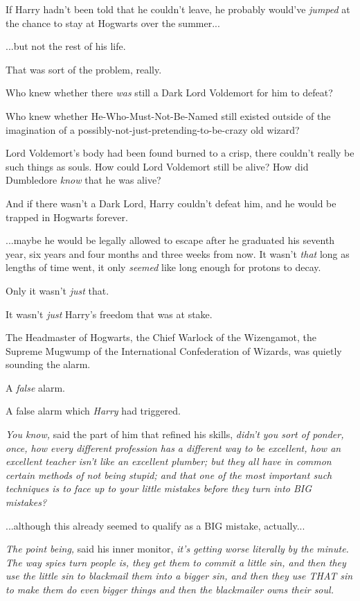 If Harry hadn't been told that he couldn't leave, he probably would've \emph{jumped} at the chance to stay at Hogwarts over the summer...

...but not the rest of his life.

That was sort of the problem, really.

Who knew whether there \emph{was} still a Dark Lord Voldemort for him to defeat?

Who knew whether He-Who-Must-Not-Be-Named still existed outside of the imagination of a possibly-not-just-pretending-to-be-crazy old wizard?

Lord Voldemort's body had been found burned to a crisp, there couldn't really be such things as souls. How could Lord Voldemort still be alive? How did Dumbledore \emph{know} that he was alive?

And if there wasn't a Dark Lord, Harry couldn't defeat him, and he would be trapped in Hogwarts forever.

...maybe he would be legally allowed to escape after he graduated his seventh year, six years and four months and three weeks from now. It wasn't \emph{that} long as lengths of time went, it only \emph{seemed} like long enough for protons to decay.

Only it wasn't \emph{just} that.

It wasn't \emph{just} Harry's freedom that was at stake.

The Headmaster of Hogwarts, the Chief Warlock of the Wizengamot, the Supreme Mugwump of the International Confederation of Wizards, was quietly sounding the alarm.

A \emph{false} alarm.

A false alarm which \emph{Harry} had triggered.

\emph{You know,} said the part of him that refined his skills, \emph{didn't you sort of ponder, once, how every different profession has a different way to be excellent, how an excellent teacher isn't like an excellent plumber; but they all have in common certain methods of not being stupid; and that one of the most important such techniques is to face up to your little mistakes before they turn into BIG mistakes?}

...although this already seemed to qualify as a BIG mistake, actually...

\emph{The point being,} said his inner monitor, \emph{it's getting worse literally by the minute. The way spies turn people is, they get them to commit a little sin, and then they use the little sin to blackmail them into a bigger sin, and then they use THAT sin to make them do even bigger things and then the blackmailer owns their soul.}

